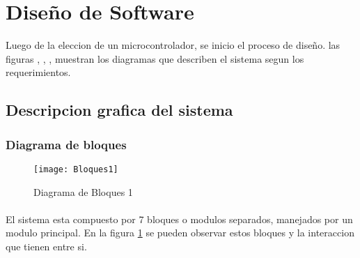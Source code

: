 \section{Dise\~no de Software} %
\label{sec:dise~no_de_software}


Luego de la eleccion de un microcontrolador, se inicio el proceso de dise\~no. las figuras , , , muestran los diagramas que describen el sistema segun los requerimientos.

\subsection{Descripcion grafica del sistema} %
\label{sub:descripcion_grafica_del_sistema}

\subsubsection{Diagrama de bloques} %
\label{ssub:diagrama_de_bloques}

\begin{figure}[h]
  \centering
  \texttt{[image: Bloques1]}
  \caption{Diagrama de Bloques 1}\label{fig:bloques1}
\end{figure}

\paragraph{}
El sistema esta compuesto por 7 bloques o modulos separados, manejados por un modulo principal. En la figura \ref{fig:bloques1} se pueden observar estos bloques y la interaccion que tienen entre si.
\paragraph{}


